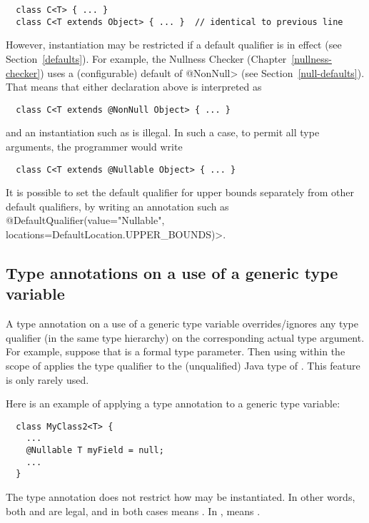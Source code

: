 \begin{Verbatim}
  class C<T> { ... }
  class C<T extends Object> { ... }  // identical to previous line
\end{Verbatim}

\noindent
However, instantiation may be restricted if a default qualifier is in
effect (see Section~\ref{defaults}).  For example, the Nullness Checker
(Chapter~\ref{nullness-checker}) uses a (configurable) default of
\<@NonNull> (see Section~\ref{null-defaults}).  That means that either
declaration above is interpreted as

\begin{Verbatim}
  class C<T extends @NonNull Object> { ... }
\end{Verbatim}

\noindent
and an instantiation such as  is illegal.
In such a case, to permit all type arguments, the programmer would write

\begin{Verbatim}
  class C<T extends @Nullable Object> { ... }
\end{Verbatim}


It is possible to set the default qualifier for upper bounds separately
from other default qualifiers, by writing an annotation such as
\<@DefaultQualifier(value="Nullable", locations={DefaultLocation.UPPER\_BOUNDS})>.


\subsection{Type annotations on a use of a generic type variable}

A type annotation on a use of a generic type variable overrides/ignores any type
qualifier (in the same type hierarchy) on the corresponding actual type
argument.  For example, suppose that  is a formal type parameter.
Then using  within the scope of  applies the type
qualifier  to the (unqualified) Java type of \@.
This feature is only rarely used.

Here is an example of applying a type annotation to a generic type
variable:

\begin{Verbatim}
  class MyClass2<T> {
    ...
    @Nullable T myField = null;
    ...
  }
\end{Verbatim}

\noindent
The type annotation does not restrict how  may be
instantiated.  In other words, both
 and  are
legal, and in both cases  means .
In ,
 means .

